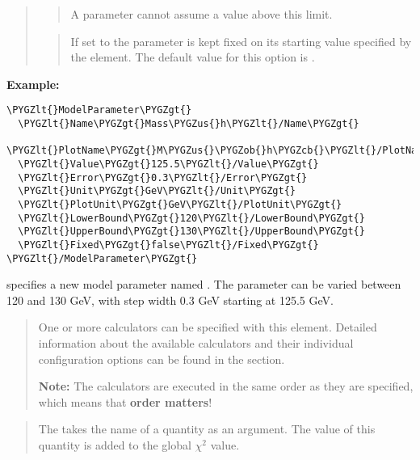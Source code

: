\documentclass[letterpaper,10pt,english]{sphinxmanual}
\def\PYGZus{\char`\_}
\def\PYGZob{\char`\{}
\def\PYGZcb{\char`\}}
\def\PYGZlt{\char`\<}
\def\PYGZgt{\char`\>}
\begin{document}
\begin{quote}
\begin{quote}

A parameter cannot assume a value above this limit.
\end{quote}

\begin{quote}

If set to  the parameter is kept fixed on its starting value specified by the
 element. The default value for this option is .
\end{quote}
\end{quote}

\textbf{Example:}

\begin{Verbatim}[commandchars=\\\{\}]
\PYGZlt{}ModelParameter\PYGZgt{}
  \PYGZlt{}Name\PYGZgt{}Mass\PYGZus{}h\PYGZlt{}/Name\PYGZgt{}
  \PYGZlt{}PlotName\PYGZgt{}M\PYGZus{}\PYGZob{}h\PYGZcb{}\PYGZlt{}/PlotName\PYGZgt{}
  \PYGZlt{}Value\PYGZgt{}125.5\PYGZlt{}/Value\PYGZgt{}
  \PYGZlt{}Error\PYGZgt{}0.3\PYGZlt{}/Error\PYGZgt{}
  \PYGZlt{}Unit\PYGZgt{}GeV\PYGZlt{}/Unit\PYGZgt{}
  \PYGZlt{}PlotUnit\PYGZgt{}GeV\PYGZlt{}/PlotUnit\PYGZgt{}
  \PYGZlt{}LowerBound\PYGZgt{}120\PYGZlt{}/LowerBound\PYGZgt{}
  \PYGZlt{}UpperBound\PYGZgt{}130\PYGZlt{}/UpperBound\PYGZgt{}
  \PYGZlt{}Fixed\PYGZgt{}false\PYGZlt{}/Fixed\PYGZgt{}
\PYGZlt{}/ModelParameter\PYGZgt{}
\end{Verbatim}

specifies a new model parameter named . The parameter can be varied between 120 and 130
GeV, with step width 0.3 GeV starting at 125.5 GeV.

\begin{quote}

One or more calculators can be specified with this element. Detailed information about the
available calculators and their individual configuration options can be found in the
{\hyperref[calculators:calculators]{\emph{}}} section.

\textbf{Note:} The calculators are executed in the same order as they are specified, which means that
\textbf{order matters}!
\end{quote}

\begin{quote}

The  takes the name of a quantity as an argument. The value of this
quantity is added to the global \(\chi^2\) value.
\end{quote}
\end{document}
